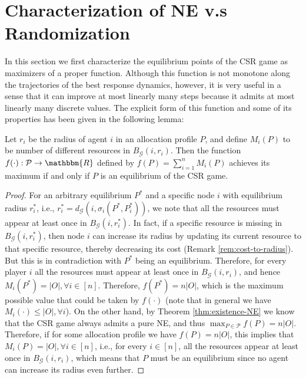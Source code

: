 
\section{Characterization of NE v.s Randomization}\label{sec:main-I}

In this section we first characterize the equilibrium points of the CSR game as maximizers of a proper function. Although this function is not monotone along the trajectories of the best response dynamics, however, it is very useful in a sense that it can improve at most linearly many steps because it admits at most linearly many discrete values. The explicit form of this function and some of its properties has been given in the following lemma:

\smallskip
\begin{lemma}\label{lem:NE-characterization}
Let $r_i$ be the radius of agent $i$ in an allocation profile $P$, and define $M_i(P)$ to be number of different resources in $B_{\mathcal{G}}(i,r_i)$. Then the function $f(\cdot):\mathcal{P}\rightarrow \mathbbm{R}$ defined by $f(P)=\sum_{i=1}^{n}M_i(P)$ achieves its maximum if and only if $P$ is an equilibrium of the CSR game.
\end{lemma}
\begin{proof}
For an arbitrary equilibrium $P^*$ and a specific node $i$ with equilibrium radius $r^*_i$, i.e., $r^*_i=d_{\mathcal{G}}(i,\sigma_i(P^*,P^*_i))$, we note that all the resources must appear at least once in $B_{\mathcal{G}}(i,r^*_i)$. In fact, if a specific resource is missing in $B_{\mathcal{G}}(i,r^*_i)$, then node $i$ can increase its radius by updating its current resource to that specific resource, thereby decreasing its cost (Remark \ref{rem:cost-to-radius}). But this is in contradiction with $P^*$ being an equilibrium. Therefore, for every player $i$ all the resources must appear at least once in $B_{\mathcal{G}}(i,r_i)$, and hence $M_i(P^*)=|O|, \forall i\in [n]$. Therefore, $f(P^*)=n|O|$, which is the maximum possible value that could be taken by $f(\cdot)$ (note that in general we have  $M_i(\cdot)\leq |O|, \forall i$). On the other hand, by Theorem \ref{thm:existence-NE} we know that the CSR game always admits a pure NE, and thus $\max_{P\in \mathcal{P}}f(P)=n|O|$. Therefore, if for some allocation profile we have $f(P)=n|O|$, this implies that $M_i(P)=|O|, \forall i\in [n]$, i.e., for every $i\in [n]$, all the resources appear at least once in $B_{\mathcal{G}}(i,r_i)$, which means that $P$ must be an equilibrium since no agent can increase its radius even further.
\end{proof}

